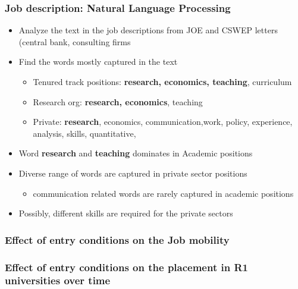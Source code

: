 \documentclass[11pt]{beamer}
\begin{document}
\begin{frame}[label = NLP]
	\frametitle{Job description: Natural Language Processing}
	\begin{itemize}
		\item Analyze the text in the job descriptions from JOE and CSWEP letters (central bank, consulting firms
		\item Find the words mostly captured in the text
		\begin{itemize}
			\item Tenured track positions: \textbf{research, economics, teaching}, curriculum
			\item Research org: \textbf{research, economics}, teaching
			\item Private: \textbf{research}, economics, communication,work, policy, experience, analysis, skills, quantitative, 
		\end{itemize}
		
		\item Word \textbf{research} and \textbf{teaching} dominates in Academic positions
		\item Diverse range of words are captured in private sector positions
		\begin{itemize}
			\item communication related words are rarely captured in academic positions
		\end{itemize} 
		\item Possibly, different skills are required for the private sectors \hyperlink{Occupation}{}
	\end{itemize}
\end{frame}


{
	\begin{frame}[label = mobility]
		\frametitle{Effect of entry conditions on the Job mobility}
		
		\hyperlink{discussion}{}
	\end{frame}
}

{
	\begin{frame}[label = signal]
		\frametitle{Effect of entry conditions on the placement in R1 universities over time}
		
		\hyperlink{discussion}{}
	\end{frame}
}
\end{document}
